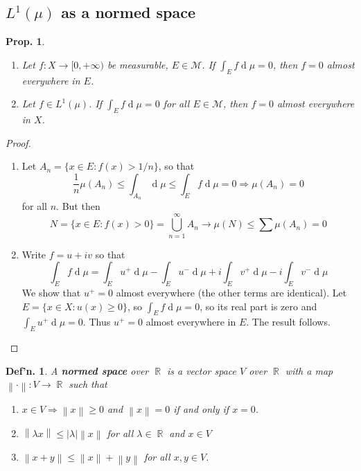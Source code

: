 \documentclass[12pt, a4paper]{book}
\DeclareMathOperator{\R}{\mathbb{R}}
\renewcommand{\d}[1]{\ensuremath{\operatorname{d}\!{#1}}} %
\newcommand{\norm}[1]{\left\lVert#1\right\rVert} %
\newtheorem{definition}[theorem]{Def'n.}
\newtheorem{proposition}[theorem]{Prop.}
\theoremstyle{nonumberplain}
\newtheorem{proof}{Proof}
\begin{document}
\subsection{$L^1(\mu)$ as a normed space}
\begin{proposition}
    \begin{enumerate}
        \item Let $f:X\to[0,+\infty)$ be measurable, $E\in\mathcal{M}$.
            If $\int_E f\d{\mu}=0$, then $f=0$ almost everywhere in $E$.
        \item Let $f\in L^1(\mu)$.
            If $\int_E f\d{\mu}=0$ for all $E\in\mathcal{M}$, then $f=0$ almost everywhere in $X$.
    \end{enumerate}
\end{proposition}
\begin{proof}
    \begin{enumerate}
        \item Let $A_n=\{x\in E:f(x)>1/n\}$, so that
            \begin{equation*}
                \frac{1}{n}\mu(A_n)\leq\int_{A_n}\d{\mu}\leq\int_E f\d{\mu}=0\Longrightarrow \mu(A_n)=0
            \end{equation*}
            for all $n$.
            But then
            \[N=\{x\in E:f(x)>0\}=\bigcup\limits_{n=1}^\infty A_n\to \mu(N)\leq\sum\mu(A_n)=0\]
        \item Write $f=u+iv$ so that
            \begin{equation*}
                \int_E f\d{\mu}=\int_E u^+\d{\mu}-\int_E u^-\d{\mu}+i\int_E v^+\d{\mu}-i\int_E v^-\d{\mu}
            \end{equation*}
            We show that $u^+=0$ almost everywhere (the other terms are identical).
            Let $E=\{x\in X:u(x)\geq 0\}$, so $\int_E f\d{\mu}=0$, so its real part is zero and $\int_E u^+\d{\mu}=0$.
            Thus $u^+=0$ almost everywhere in $E$.
            The result follows.
    \end{enumerate}
\end{proof}
\begin{definition}
    A \textbf{normed space} over $\R$ is a vector space $V$ over $\R$ with a map $\norm{\cdot}:V\to\R$ such that
    \begin{enumerate}[label=(\roman*)]
        \item $x\in V\Rightarrow\norm{x}\geq 0$ and $\norm{x}=0$ if and only if $x=0$.
        \item $\norm{\lambda x}\leq|\lambda|\norm{x}$ for all $\lambda\in\R$ and $x\in V$
        \item $\norm{x+y}\leq\norm{x}+\norm{y}$ for all $x,y\in V$.
    \end{enumerate}
\end{definition}
\end{document}
